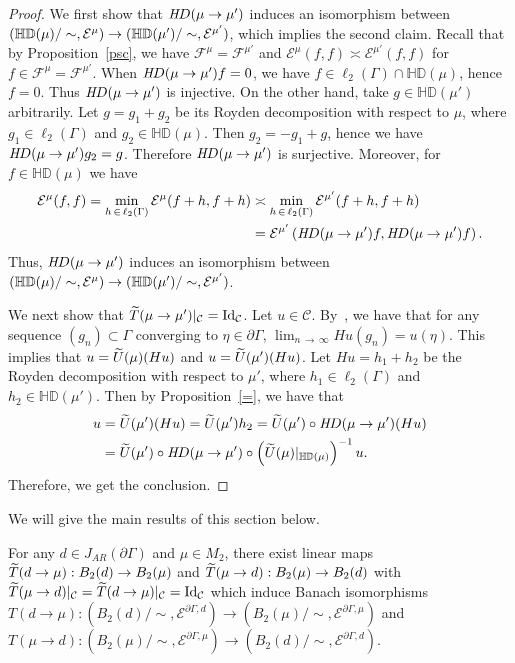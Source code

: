 \documentclass[AHL,Unicode,longabstracts,published]{cedram}
\newcommand{\ce}{\mathcal{E}}
\newcommand{\cf}{\mathcal{F}}
\newcommand{\cC}{\mathcal{C}}
\newcommand{\bHD}{\mathbb{HD}}
\newcommand{\rmId}{\mathrm{Id}}
\let\oldtilde\tilde
\renewcommand*{\tilde}[1]{\mathchoice{\widetilde{#1}}{\widetilde{#1}}{\oldtilde{#1}}{\oldtilde{#1}}}
\begin{document}
\begin{proof}
We first show that ${\textit HD}(\mu\rightarrow\mu')$ induces an isomorphism between $(\bHD(\mu)\linebreak/\sim,\ce^{\mu})\rightarrow(\bHD(\mu')/\sim,\ce^{\mu'})$, which implies the second claim. Recall that by Proposition~\ref{psc}, we have $\cf^{\mu}=\cf^{\mu'}$ and $\ce^{\mu}(f,f)\asymp\ce^{\mu'}(f,f)$ for $f\in\cf^{\mu}=\cf^{\mu'}$. When ${\textit HD}(\mu\rightarrow\mu')f=0$, we have $f\in\ell_2(\Gamma)\cap\bHD(\mu)$, hence $f=0$. Thus ${\textit HD}(\mu\rightarrow\mu')$ is injective. On the other hand, take $g\in\bHD(\mu')$ arbitrarily. Let $g=g_1+g_2$ be its Royden decomposition with respect to $\mu$, where $g_1\in\ell_2(\Gamma)$ and $g_2\in\bHD(\mu)$. Then $g_2=-g_1+g$, hence we have ${\textit HD}(\mu\rightarrow\mu')g_2=g$. Therefore ${\textit HD}(\mu\rightarrow\mu')$ is surjective. Moreover, for $f\in\bHD(\mu)$ we have
\begin{align*}
\ce^{\mu}(f,f)=\min_{h\,\in\,\ell_2(\Gamma)}\ce^{\mu}(f+h,f+h)&\asymp
\min_{h\,\in\,\ell_2(\Gamma)}\ce^{\mu'}(f+h,f+h)\\
&=\ce^{\mu'}\left({\textit HD}(\mu\rightarrow\mu')f,{\textit HD}(\mu\rightarrow\mu')f\right).
\end{align*}
Thus, ${\textit HD}(\mu\rightarrow\mu')$ induces an isomorphism between $(\bHD(\mu)/\sim,\ce^{\mu})\rightarrow(\bHD(\mu')/\linebreak \sim,\ce^{\mu'})$.

We next show that $\tilde{T}(\mu\to\mu')|_\cC=\rmId_\cC$. Let $u\in\cC$. By~\cite[Lemma~2.2]{Ka}, we have that for any sequence $(g_n)\subset\Gamma$ converging to $\eta\in\partial\Gamma$, $\lim_{n\,\to\,\infty}Hu(g_n)=u(\eta)$. This implies that $u=\tilde{U}(\mu)(Hu)$ and $u=\tilde{U}(\mu')(Hu)$. Let $Hu=h_1+h_2$ be the Royden decomposition with respect to $\mu'$, where $h_1\in\ell_2(\Gamma)$ and $h_2\in\bHD(\mu')$. Then by Proposition~\ref{=}, we have that
\begin{align*}
u&=\tilde{U}(\mu')(Hu)=\tilde{U}(\mu')h_2 =\tilde{U}(\mu')\circ {\textit HD}(\mu\rightarrow\mu')(Hu)\\
&=\tilde{U}(\mu')\circ {\textit HD}(\mu\rightarrow\mu')\circ \left(\tilde{U}(\mu)|_{\bHD(\mu)}\right)^{-1}u.
\end{align*}
Therefore, we get the conclusion.
\end{proof}


We will give the main results of this section below.

\begin{theo}\label{iso}
For any $d\in J_{AR}(\partial \Gamma)$ and $\mu\in M_2$, there exist linear maps $\tilde{T}(d\rightarrow\mu): B_2(d)\rightarrow B_2(\mu)$ and $\tilde{T}(\mu\rightarrow d):B_2(\mu)\rightarrow B_2(d)$ with $\tilde{T}(\mu\to d)|_\cC=\tilde{T}(d\to\mu)|_\cC=\rmId_\cC$ which induce Banach isomorphisms $T(d\rightarrow\mu): (B_2(d)/\sim,\ce^{\partial\Gamma,d})\rightarrow(B_2(\mu)/\sim,\ce^{\partial\Gamma,\mu})$ and $T(\mu\rightarrow d):(B_2(\mu)/\sim,\ce^{\partial\Gamma,\mu})\rightarrow (B_2(d)/\sim,\ce^{\partial\Gamma,d})$.
\end{theo}
\end{document}

